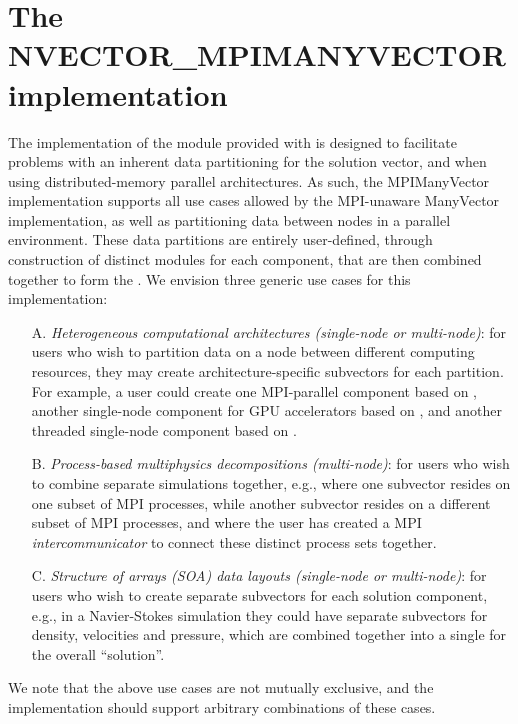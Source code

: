 %
\section{The NVECTOR\_MPIMANYVECTOR implementation}\label{ss:nvec_mpimanyvector}

The {\nvecmpimanyvector} implementation of the {\nvector} module provided
with {\sundials} is designed to facilitate problems with an inherent
data partitioning for the solution vector, and when using
distributed-memory parallel architectures.  As such, the MPIManyVector
implementation supports all use cases allowed by the MPI-unaware
ManyVector implementation, as well as partitioning data between nodes
in a parallel environment.  These data partitions are entirely
user-defined, through construction of distinct {\nvector} modules for
each component, that are then combined together to form the
{\nvecmpimanyvector}.  We envision three generic use cases for this
implementation:
\begin{itemize}
\item[A.] \emph{Heterogeneous computational architectures (single-node or
  multi-node)}: for users who wish to partition data on a node between
  different computing resources, they may create architecture-specific
  subvectors for each partition.  For example, a user could create one
  MPI-parallel component based on {\nvecp}, another single-node
  component for GPU accelerators based on {\nveccuda}, and another
  threaded single-node component based on {\nvecopenmp}.
\item[B.] \emph{Process-based multiphysics decompositions (multi-node)}: for
  users who wish to combine separate simulations together, e.g., where
  one subvector resides on one subset of MPI processes, while another
  subvector resides on a different subset of MPI processes, and where
  the user has created a MPI \emph{intercommunicator} to connect these
  distinct process sets together.
\item[C.] \emph{Structure of arrays (SOA) data layouts (single-node or
  multi-node)}: for users who wish to create separate subvectors for
  each solution component, e.g., in a Navier-Stokes simulation they
  could have separate subvectors for density, velocities and
  pressure, which are combined together into a single
  {\nvecmpimanyvector} for the overall ``solution''. 
\end{itemize}
We note that the above use cases are not mutually exclusive, and the
{\nvecmpimanyvector} implementation should support arbitrary combinations
of these cases.

